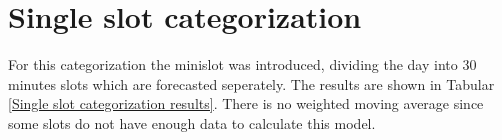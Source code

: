 \section{Single slot categorization}\label{section:Single slot categorization}
For this categorization the minislot was introduced, dividing the day into 30 minutes slots which are forecasted seperately. The results are shown in Tabular \ref{Single slot categorization results}. There is no weighted moving average since some slots do not have enough data to calculate this model.
\begin{table}[h]
\centering
\caption{Single slot categorization results}
\label{Single slot categorization results}
\end{table}
